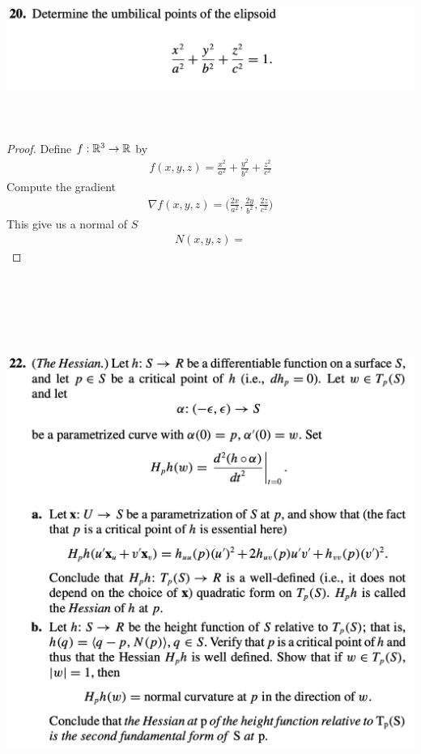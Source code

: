 \documentclass{report}
\begin{document}
\begin{question}{}{}
\includegraphics[height=5cm,width=18cm]{hw5q10}
\end{question}
\begin{proof}
Define $f:\mathbb{R}^3\rightarrow \mathbb{R}$ by 
\begin{align*}
f(x,y,z)=\frac{x^2}{a^2}+ \frac{y^2}{b^2}+ \frac{z^2}{c^2}
\end{align*}
Compute the gradient 
\begin{align*}
\nabla f(x,y,z)= \Big(\frac{2x}{a^2},\frac{2y}{b^2},\frac{2z}{c^2}\Big)
\end{align*}
This give us a normal of $S$ 
 \begin{align*}
N(x,y,z)=  
\end{align*}
\end{proof}
\begin{question}{}{}
\includegraphics[height=18cm,width=18cm]{hw5q11}
\end{question}
\end{document}
